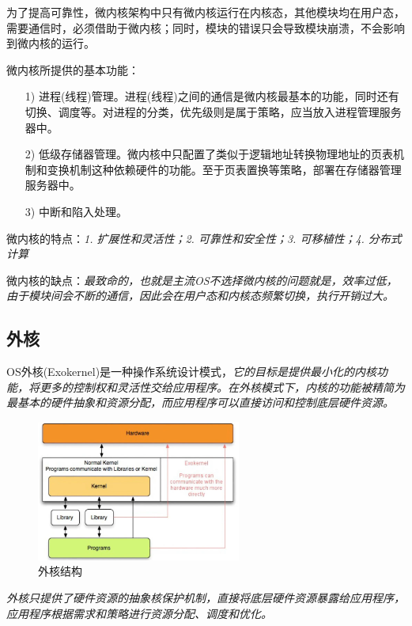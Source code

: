     为了提高可靠性，微内核架构中只有微内核运行在内核态，其他模块均在用户态，需要通信时，必须借助于微内核；同时，模块的错误只会导致模块崩溃，不会影响到微内核的运行。

    微内核所提供的基本功能：

\begin{itemize}
    \item [1)] 进程(线程)管理。进程(线程)之间的通信是微内核最基本的功能，同时还有切换、调度等。{\color{red}对进程的分类，优先级则是属于策略，应当放入进程管理服务器中}。
    \item [2)] 低级存储器管理。微内核中只配置了类似于逻辑地址转换物理地址的页表机制和变换机制这种依赖硬件的功能。至于页表置换等策略，部署在存储器管理服务器中。
    \item [3)] 中断和陷入处理。
\end{itemize}

    微内核的特点：\emph{1. 扩展性和灵活性；2. 可靠性和安全性；3. 可移植性；4. 分布式计算}

    微内核的缺点：\emph{{\color{red}最致命的，也就是主流OS不选择微内核的问题就是，效率过低，由于模块间会不断的通信，因此会在用户态和内核态频繁切换，执行开销过大。}}

\subsection{外核}

    OS外核(Exokernel)是一种操作系统设计模式，\emph{它的目标是提供最小化的内核功能，将更多的控制权和灵活性交给应用程序。在外核模式下，内核的功能被精简为最基本的硬件抽象和资源分配，而应用程序可以直接访问和控制底层硬件资源。}

\begin{figure}[!htbp]
    \centering
    \includegraphics[width=0.6\textwidth]{image/chapter01/外核结构.png}
    \caption{外核结构}
\end{figure}

    \emph{外核{\color{red}只提供了硬件资源的抽象核保护机制，直接将底层硬件资源暴露}给应用程序，应用程序根据需求和策略进行资源分配、调度和优化。}

